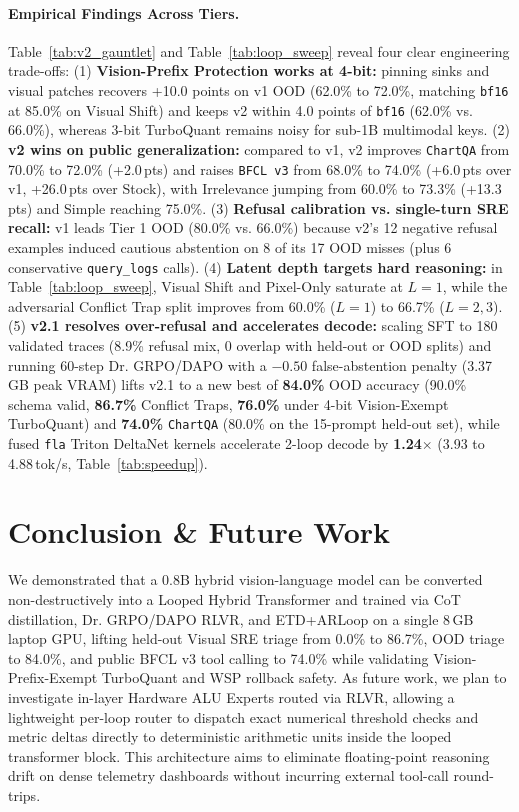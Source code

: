 \documentclass[10pt,letterpaper]{article}
\begin{document}
\paragraph{Empirical Findings Across Tiers.} Table~\ref{tab:v2_gauntlet} and Table~\ref{tab:loop_sweep} reveal four clear engineering trade-offs:
(1) \textbf{Vision-Prefix Protection works at 4-bit:} pinning sinks and visual patches recovers +10.0 points on v1 OOD (62.0\% to 72.0\%, matching \texttt{bf16} at 85.0\% on Visual Shift) and keeps v2 within 4.0 points of \texttt{bf16} (62.0\% vs. 66.0\%), whereas 3-bit TurboQuant remains noisy for sub-1B multimodal keys.
(2) \textbf{v2 wins on public generalization:} compared to v1, v2 improves \texttt{ChartQA} from 70.0\% to 72.0\% (+2.0\,pts) and raises \texttt{BFCL v3} from 68.0\% to 74.0\% (+6.0\,pts over v1, +26.0\,pts over Stock), with Irrelevance jumping from 60.0\% to 73.3\% (+13.3\,pts) and Simple reaching 75.0\%.
(3) \textbf{Refusal calibration vs. single-turn SRE recall:} v1 leads Tier 1 OOD (80.0\% vs. 66.0\%) because v2's 12 negative refusal examples induced cautious abstention on 8 of its 17 OOD misses (plus 6 conservative \texttt{query\_logs} calls).
(4) \textbf{Latent depth targets hard reasoning:} in Table~\ref{tab:loop_sweep}, Visual Shift and Pixel-Only saturate at $L=1$, while the adversarial Conflict Trap split improves from 60.0\% ($L=1$) to 66.7\% ($L=2, 3$).
(5) \textbf{v2.1 resolves over-refusal and accelerates decode:} scaling SFT to 180 validated traces (8.9\% refusal mix, 0 overlap with held-out or OOD splits) and running 60-step Dr. GRPO/DAPO with a $-0.50$ false-abstention penalty (3.37\,GB peak VRAM) lifts v2.1 to a new best of \textbf{84.0\%} OOD accuracy (90.0\% schema valid, \textbf{86.7\%} Conflict Traps, \textbf{76.0\%} under 4-bit Vision-Exempt TurboQuant) and \textbf{74.0\%} \texttt{ChartQA} (80.0\% on the 15-prompt held-out set), while fused \texttt{fla} Triton DeltaNet kernels accelerate 2-loop decode by \textbf{1.24$\times$} (3.93 to 4.88\,tok/s, Table~\ref{tab:speedup}).

\FloatBarrier
\section{Conclusion \& Future Work}
We demonstrated that a 0.8B hybrid vision-language model can be converted non-destructively into a Looped Hybrid Transformer and trained via CoT distillation, Dr. GRPO/DAPO RLVR, and ETD+ARLoop on a single 8\,GB laptop GPU, lifting held-out Visual SRE triage from 0.0\% to 86.7\%, OOD triage to 84.0\%, and public BFCL v3 tool calling to 74.0\% while validating Vision-Prefix-Exempt TurboQuant and WSP rollback safety. As future work, we plan to investigate in-layer Hardware ALU Experts routed via RLVR, allowing a lightweight per-loop router to dispatch exact numerical threshold checks and metric deltas directly to deterministic arithmetic units inside the looped transformer block. This architecture aims to eliminate floating-point reasoning drift on dense telemetry dashboards without incurring external tool-call round-trips.
\end{document}
